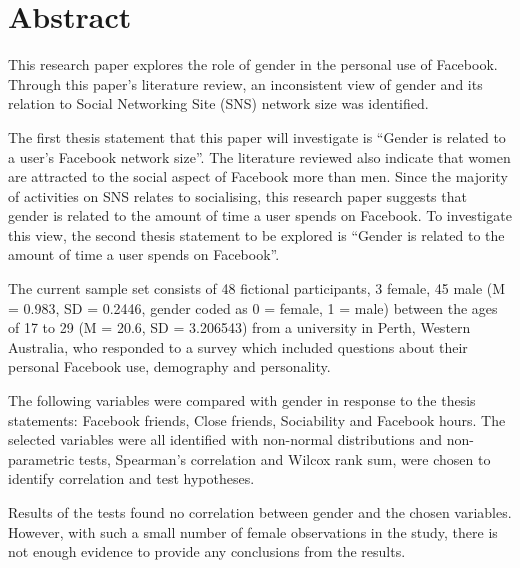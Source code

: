 \section{Abstract}

This research paper explores the role of gender in the personal use of Facebook. Through this paper's literature review, an inconsistent view of gender and its relation to Social Networking Site (SNS) network size was identified.

The first thesis statement that this paper will investigate is ``Gender is related to a user's Facebook network size''. The literature reviewed also indicate that women are attracted to the social aspect of Facebook more than men. Since the majority of activities on SNS relates to socialising, this research paper suggests that gender is related to the amount of time a user spends on Facebook. To investigate this view, the second thesis statement to be explored is ``Gender is related to the amount of time a user spends on Facebook''.

The current sample set consists of 48 fictional participants, 3 female, 45 male (M = 0.983, SD = 0.2446, gender coded as 0 = female, 1 = male) between the ages of 17 to 29 (M = 20.6, SD = 3.206543) from a university in Perth, Western Australia, who responded to a survey which included questions about their personal Facebook use, demography and personality.

The following variables were compared with gender in response to the thesis statements: Facebook friends, Close friends, Sociability and Facebook hours. The selected variables were all identified with non-normal distributions and non-parametric tests, Spearman's correlation and Wilcox rank sum, were chosen to identify correlation and test hypotheses.

Results of the tests found no correlation between gender and the chosen variables. However, with such a small number of female observations in the study, there is not enough evidence to provide any conclusions from the results.